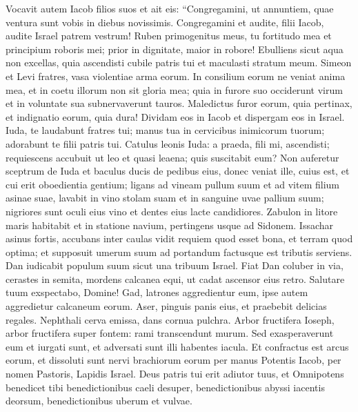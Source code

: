 \begin{biblechapter}  
\verse Vocavit autem Iacob filios suos et ait eis: “Congregamini, ut annuntiem, quae ventura sunt vobis in diebus novissimis. 
\verse Congregamini et audite, filii Iacob, audite Israel patrem vestrum! 
\verse Ruben primogenitus meus, tu fortitudo mea et principium roboris mei; prior in dignitate, maior in robore! 
\verse Ebulliens sicut aqua non excellas, quia ascendisti cubile patris tui et maculasti stratum meum. 
\verse Simeon et Levi fratres, vasa violentiae arma eorum. 
\verse In consilium eorum ne veniat anima mea, et in coetu illorum non sit gloria mea; quia in furore suo occiderunt virum et in voluntate sua subnervaverunt tauros. 
\verse Maledictus furor eorum, quia pertinax, et indignatio eorum, quia dura! Dividam eos in Iacob et dispergam eos in Israel. 
\verse Iuda, te laudabunt fratres tui; manus tua in cervicibus inimicorum tuorum; adorabunt te filii patris tui. 
\verse Catulus leonis Iuda: a praeda, fili mi, ascendisti; requiescens accubuit ut leo et quasi leaena; quis suscitabit eum? 
\verse Non auferetur sceptrum de Iuda et baculus ducis de pedibus eius, donec veniat ille, cuius est, et cui erit oboedientia gentium; 
\verse ligans ad vineam pullum suum et ad vitem filium asinae suae, lavabit in vino stolam suam et in sanguine uvae pallium suum; 
\verse nigriores sunt oculi eius vino et dentes eius lacte candidiores. 
\verse Zabulon in litore maris habitabit et in statione navium, pertingens usque ad Sidonem. 
\verse Issachar asinus fortis, accubans inter caulas 
\verse vidit requiem quod esset bona, et terram quod optima; et supposuit umerum suum ad portandum factusque est tributis serviens. 
\verse Dan iudicabit populum suum sicut una tribuum Israel. 
\verse Fiat Dan coluber in via, cerastes in semita, mordens calcanea equi, ut cadat ascensor eius retro. 
\verse Salutare tuum exspectabo, Domine! 
\verse Gad, latrones aggredientur eum, ipse autem aggredietur calcaneum eorum. 
\verse Aser, pinguis panis eius, et praebebit delicias regales. 
\verse Nephthali cerva emissa, dans cornua pulchra. 
\verse Arbor fructifera Ioseph, arbor fructifera super fontem: rami transcendunt murum. 
\verse Sed exasperaverunt eum et iurgati sunt, et adversati sunt illi habentes iacula. 
\verse Et confractus est arcus eorum, et dissoluti sunt nervi brachiorum eorum per manus Potentis Iacob, per nomen Pastoris, Lapidis Israel. 
\verse Deus patris tui erit adiutor tuus, et Omnipotens benedicet tibi benedictionibus caeli desuper, benedictionibus abyssi iacentis deorsum, benedictionibus uberum et vulvae. 

\end{biblechapter}
